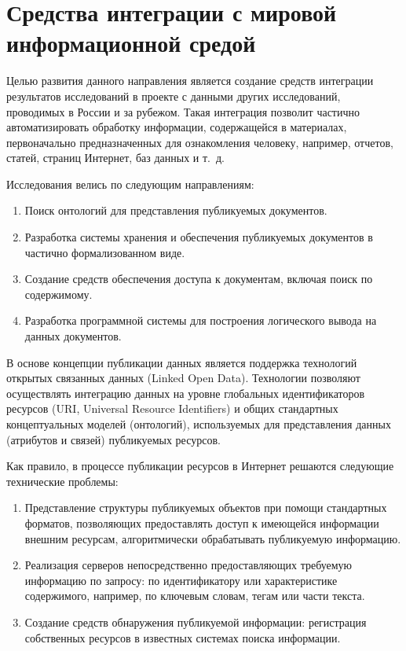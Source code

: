 \documentclass[a4paper,12pt,openany,final]{extreport}
\begin{document}
\chapter{Средства интеграции с мировой информационной средой}\label{chap:7}

Целью развития данного направления является создание средств интеграции результатов исследований в проекте с данными других исследований, проводимых в России и за рубежом. Такая интеграция позволит частично автоматизировать обработку информации, содержащейся в материалах, первоначально предназначенных для ознакомления человеку, например, отчетов, статей, страниц Интернет, баз данных и т.~д.

Исследования велись по следующим направлениям:
\begin{enumerate}
\item Поиск онтологий для представления публикуемых документов.
\item Разработка системы хранения и обеспечения публикуемых документов в частично формализованном виде.
\item Создание средств обеспечения доступа к документам, включая поиск по содержимому.
\item Разработка программной системы для построения логического вывода на данных документов.
\end{enumerate}

В основе концепции публикации данных является поддержка технологий открытых связанных данных (Linked Open Data). Технологии позволяют осуществлять интеграцию данных на уровне глобальных идентификаторов ресурсов (URI, Universal Resource Identifiers) и общих стандартных концептуальных моделей (онтологий), используемых для представления данных (атрибутов и связей) публикуемых ресурсов.

Как правило, в процессе публикации ресурсов в Интернет решаются следующие технические проблемы:
\begin{enumerate}
\item Представление структуры публикуемых объектов при помощи стандартных форматов, позволяющих предоставлять доступ к имеющейся информации внешним ресурсам, алгоритмически обрабатывать публикуемую информацию.
\item Реализация серверов непосредственно предоставляющих требуемую информацию по запросу: по идентификатору или характеристике содержимого, например, по ключевым словам, тегам или части текста.
\item Создание средств обнаружения публикуемой информации: регистрация собственных ресурсов в известных системах поиска информации.
\end{enumerate}
\end{document}
